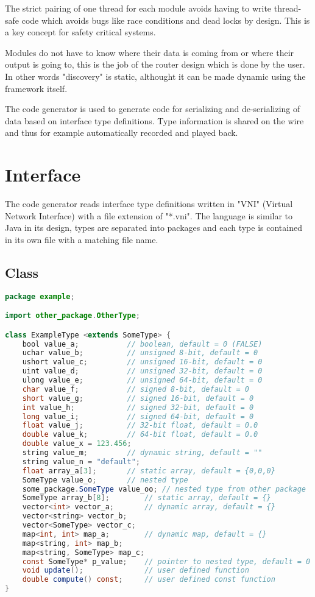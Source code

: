 \documentclass[10pt,a4paper]{report}
\begin{document}
The strict pairing of one thread for each module avoids having to write thread-safe code which avoids bugs like race conditions and dead locks by design. This is a key concept for safety critical systems.

Modules do not have to know where their data is coming from or where their output is going to, this is the job of the router design which is done by the user. In other words "discovery" is static, althought it can be made dynamic using the framework itself.

The code generator is used to generate code for serializing and de-serializing of data based on interface type definitions. Type information is shared on the wire and thus for example automatically recorded and played back.

\section{Interface}
The code generator reads interface type definitions written in "VNI" (Virtual Network Interface) with a file extension of "*.vni". The language is similar to Java in its design, types are separated into packages and each type is contained in its own file with a matching file name.

\subsection{Class}

\begin{lstlisting}[language=Java, caption=ExampleType.vni]
package example;

import other_package.OtherType;

class ExampleType <extends SomeType> {
	bool value_a;			// boolean, default = 0 (FALSE)
	uchar value_b;			// unsigned 8-bit, default = 0
	ushort value_c;			// unsigned 16-bit, default = 0
	uint value_d;			// unsigned 32-bit, default = 0
	ulong value_e;			// unsigned 64-bit, default = 0
	char value_f;			// signed 8-bit, default = 0
	short value_g;			// signed 16-bit, default = 0
	int value_h;			// signed 32-bit, default = 0
	long value_i;			// signed 64-bit, default = 0
	float value_j;			// 32-bit float, default = 0.0
	double value_k;			// 64-bit float, default = 0.0
	double value_x = 123.456;
	string value_m;			// dynamic string, default = ""
	string value_n = "default";
	float array_a[3];		// static array, default = {0,0,0}
	SomeType value_o;		// nested type
	some_package.SomeType value_oo;	// nested type from other package
	SomeType array_b[8];		// static array, default = {}
	vector<int> vector_a;		// dynamic array, default = {}
	vector<string> vector_b;		
	vector<SomeType> vector_c;
	map<int, int> map_a;		// dynamic map, default = {}
	map<string, int> map_b;
	map<string, SomeType> map_c;
	const SomeType* p_value;	// pointer to nested type, default = 0
	void update();				// user defined function
	double compute() const;		// user defined const function
}
\end{lstlisting}
\end{document}
